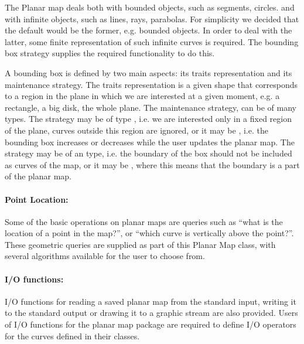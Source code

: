 The Planar map deals both with bounded objects, such as segments, circles.
and with infinite objects, such as lines, rays, parabolas.
For simplicity we decided that the default would be the former, e.g. bounded objects.
In order to deal with the latter, some finite representation of such infinite curves is required. The bounding box strategy supplies the required functionality to do this.

A bounding box is defined by two main aspects: its traits representation and its maintenance strategy.
The traits representation is a given shape that corresponds to a region in the plane in which we are interested at a given moment, e.g. a rectangle, a big disk, the whole plane.
The maintenance strategy, can be of many types. The strategy may be of  type , i.e. we are interested only in a fixed region of the plane, curves outside this region are ignored, or it may be , i.e. the bounding box increases or decreases while the user updates the planar map.
The strategy may be of an  type, i.e. the boundary of the box should not be included as curves of the map, or it may be , where this means that the boundary is a part of the planar map.

\paragraph{Point Location:}

Some of the basic operations on planar maps are queries such as ``what is the location of a point in the map?'', or ``which curve is vertically above the point?''.
These geometric queries are supplied as part of this Planar Map class, with 
several algorithms available for the user to choose from.

\paragraph{I/O functions:}
I/O functions for reading a saved planar map from the standard input, 
writing it to the standard output or drawing it to a graphic stream are also provided.
Users of I/O functions for the planar map package are required to define I/O 
operators for the curves defined in their  classes.


